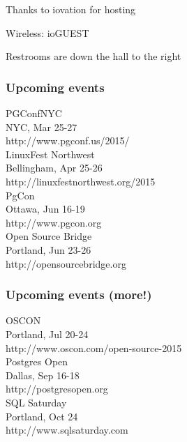 \documentclass{beamer}
\begin{document}

\frame
{
  \begin{center}
  \item[]Thanks to iovation for hosting
  \item[]Wireless: ioGUEST
  \item[]Restrooms are down the hall to the right
  \end{center}
}

\frame
{
  \frametitle{Upcoming events}
  \begin{center}
{\large PGConfNYC\\}
NYC, Mar 25-27\\
http://www.pgconf.us/2015/\\
\vspace{5 mm}
{\large LinuxFest Northwest\\}
Bellingham, Apr 25-26\\
http://linuxfestnorthwest.org/2015\\
\vspace{5 mm}
{\large PgCon\\}
Ottawa, Jun 16-19\\
http://www.pgcon.org\\
\vspace{5 mm}
{\large Open Source Bridge\\}
Portland, Jun 23-26\\
http://opensourcebridge.org\\
  \end{center}
}

\frame
{
  \frametitle{Upcoming events (more!)}
  \begin{center}
{\large OSCON\\}
Portland, Jul 20-24\\
http://www.oscon.com/open-source-2015\\
\vspace{5 mm}
{\large Postgres Open\\}
Dallas, Sep 16-18\\
http://postgresopen.org\\
\vspace{5 mm}
{\large SQL Saturday\\}
Portland, Oct 24\\
http://www.sqlsaturday.com\\
  \end{center}
}
\end{document}
